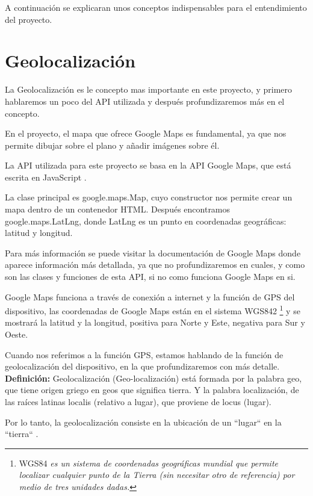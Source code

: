 
A continuación se explicaran unos conceptos indispensables para el entendimiento del proyecto.
\section{Geolocalización}\label{geolocalizacion}
La Geolocalización es le concepto mas importante en este proyecto, y primero hablaremos un poco del API utilizada y después profundizaremos más en el concepto.

En el proyecto, el mapa que ofrece Google Maps es fundamental, ya que nos permite dibujar sobre el plano y añadir imágenes 
sobre él.

La API utilizada para este proyecto se basa en la API Google Maps, que está escrita en JavaScript \cite{noauthor_google_nodate:a}.

La clase principal es google.maps.Map, cuyo constructor nos permite crear un mapa dentro de un contenedor HTML. Después encontramos google.maps.LatLng, donde LatLng es un punto en coordenadas geográficas: latitud y longitud.

Para más información se puede visitar la documentación de Google Maps donde aparece información más detallada, ya que no profundizaremos en cuales, y como son las clases y funciones de esta API, si no como funciona Google Maps en si.

Google Maps funciona a través de conexión a internet y la función de GPS del dispositivo, las coordenadas de Google Maps están en el sistema WGS842 \footnote{WGS84 \textit{es un sistema de coordenadas geográficas mundial que permite localizar cualquier punto de la Tierra (sin necesitar otro de referencia) por medio de tres unidades dadas.}} y se mostrará la latitud y la longitud, positiva para Norte y Este, negativa para Sur y Oeste.

Cuando nos referimos a la función GPS, estamos hablando de la función de geolocalización del dispositivo, en la que profundizaremos con más detalle.
\\

\textbf{Definición:} Geolocalización (Geo-localización) está formada por la palabra geo, que tiene origen griego en geos que significa tierra. Y la palabra localización, de las raíces latinas localis  (relativo a lugar), que proviene de locus (lugar).

Por lo tanto, la geolocalización consiste en la ubicación de un ``lugar`` en la ``tierra`` \cite{noauthor_diccionario_nodate:a}. 

